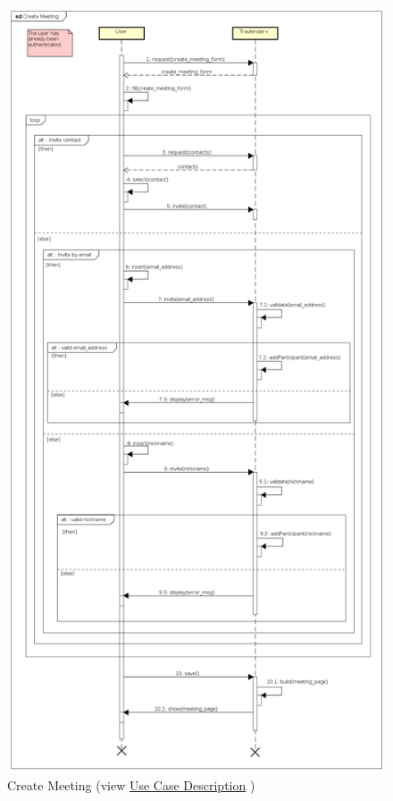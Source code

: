 \begin{figure}[H]
	\centering\includegraphics[height=\textheight]{Images/SequenceDiagrams/User/CreateMeeting.png}{}
	\caption[Create Meeting]{{Create Meeting}\label{SeqDiagr:CreateMeeting} (view \hyperref[UseCaseDescr:CreateMeeting]{Use Case Description} )}
\end{figure}

